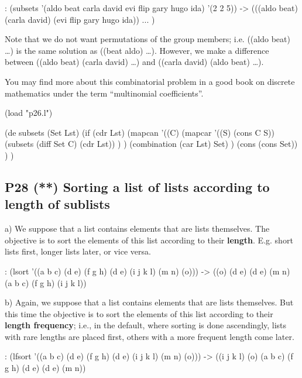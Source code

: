 \begin{wideverbatim}
   : (subsets '(aldo beat carla david evi flip gary hugo ida) '(2 2 5))
   -> (((aldo beat) (carla david) (evi flip gary hugo ida))
   ... )
\end{wideverbatim}

Note that we do not want permutations of the group members; i.e. ((aldo
beat) \ldots{}) is the same solution as ((beat aldo) \ldots{}). However,
we make a difference between ((aldo beat) (carla david) \ldots{}) and
((carla david) (aldo beat) \ldots{}).

You may find more about this combinatorial problem in a good book on
discrete mathematics under the term ``multinomial coefficients''.

\begin{wideverbatim}

(load "p26.l")

(de subsets (Set Lst)
   (if (cdr Lst)
      (mapcan
         '((C)
            (mapcar
               '((S) (cons C S))
               (subsets (diff Set C) (cdr Lst)) ) )
         (combination (car Lst) Set) )
      (cons (cons Set)) ) )

\end{wideverbatim}

\pagebreak{}
\subsection*{{P28} (**) Sorting a list of lists
according to length of sublists}
\label{sec:99-problems-P28}

a) We suppose that a list contains elements that are lists themselves.
The objective is to sort the elements of this list according to their
\textbf{length}. E.g. short lists first, longer lists later, or vice
versa.

\begin{wideverbatim}
   : (lsort '((a b c) (d e) (f g h) (d e) (i j k l) (m n) (o)))
   -> ((o) (d e) (d e) (m n) (a b c) (f g h) (i j k l))
\end{wideverbatim}

b) Again, we suppose that a list contains elements that are lists
themselves. But this time the objective is to sort the elements of this
list according to their \textbf{length frequency}; i.e., in the default,
where sorting is done ascendingly, lists with rare lengths are placed
first, others with a more frequent length come later.

\begin{wideverbatim}
   : (lfsort '((a b c) (d e) (f g h) (d e) (i j k l) (m n) (o)))
   -> ((i j k l) (o) (a b c) (f g h) (d e) (d e) (m n))
\end{wideverbatim}

